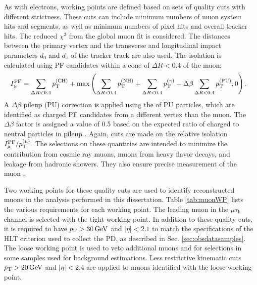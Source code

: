 \documentclass[12pt]{thesis}  %
\newcommand{\tauh}{\ensuremath{\tau_{\text{h}}}\xspace}
\newcommand{\mutau}{\ensuremath{\mu\tauh}\xspace}
\begin{document}
As with electrons, working points are defined based on sets of quality cuts with different strictness. These cuts can include minimum numbers of muon system hits and segments, as well as minimum numbers of pixel hits and overall tracker hits. The reduced $\chi^2$ from the global muon fit is considered. The distances between the primary vertex and the transverse and longitudinal impact parameters $d_0$ and $d_z$ of the tracker track are also used. The isolation is calculated using PF candidates within a cone of $\Delta R < 0.4$ of the muon:
\begin{equation}
I^{\text{PF}}_{\mu} = \sum_{\Delta R < 0.4}{p_{\mathrm{T}}^{(\text{CH})}} + \text{max}\left( \sum_{\Delta R < 0.4}{p_{\mathrm{T}}^{(\text{NH})}} + \sum_{\Delta R < 0.4}{p_{\mathrm{T}}^{(\gamma)}} - \Delta\beta \sum_{\Delta R < 0.4}{p_{\mathrm{T}}^{(\text{PU})}}, 0 \right).
\end{equation}
A $\Delta\beta$ pileup (PU) correction is applied using the \pt of PU particles, which are identified as charged PF candidates from a different vertex than the muon. The $\Delta\beta$ factor is assigned a value of 0.5 based on the expected ratio of charged to neutral particles in pileup \cite{CMS-PAS-PFT-10-002}. Again, cuts are made on the relative isolation $I^{\text{PF}}_{\mu}/p_{\mathrm{T}}^{(\mu)}$. The selections on these quantities are intended to minimize the contribution from cosmic ray muons, muons from heavy flavor decays, and leakage from hadronic showers. They also ensure precise measurement of the muon \pt.

Two working points for these quality cuts are used to identify reconstructed muons in the analysis performed in this dissertation. Table \ref{tab:muonWP} lists the various requirements for each working point. The leading muon in the \mutau channel is selected with the tight working point. In addition to these quality cuts, it is required to have $p_{\mathrm{T}}>30\,\text{Ge\hspace{-.08em}V}$ and $|\eta|<2.1$ to match the specifications of the HLT criterion used to collect the PD, as described in Sec. \ref{sec:obsdatasamples}. The loose working point is used to veto additional muons and for selections in some samples used for background estimations. Less restrictive kinematic cuts $p_{\mathrm{T}}>20\,\text{Ge\hspace{-.08em}V}$ and $|\eta|<2.4$ are applied to muons identified with the loose working point.
\end{document}
